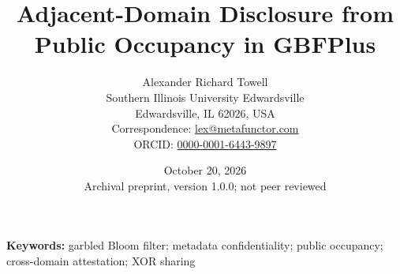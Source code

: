 \documentclass[11pt]{article}
\title{Adjacent-Domain Disclosure from Public Occupancy in GBFPlus}
\author{Alexander Richard Towell\\
\small Southern Illinois University Edwardsville\\
\small Edwardsville, IL 62026, USA\\
\small Correspondence: \href{mailto:lex@metafunctor.com}{lex@metafunctor.com}\\
\small ORCID: \href{https://orcid.org/0000-0001-6443-9897}{0000-0001-6443-9897}}
\date{October 20, 2026\\\small Archival preprint, version 1.0.0; not peer reviewed}
\begin{document}
\maketitle
\begin{abstract}

\end{abstract}
\noindent\textbf{Keywords:} garbled Bloom filter; metadata confidentiality;
public occupancy; cross-domain attestation; XOR sharing




\end{document}
